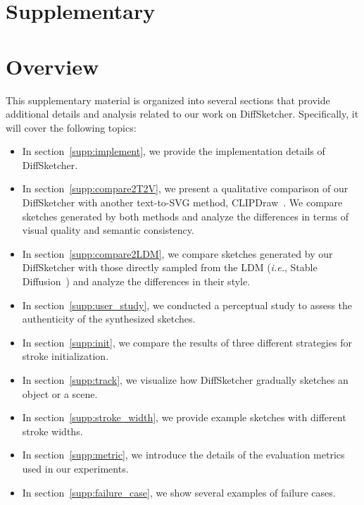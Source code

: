\documentclass{article}
\begin{document}
\medskip

\newpage
\clearpage





\newpage
\clearpage

\appendix

\section*{Supplementary}
\section*{Overview}
This supplementary material is organized into several sections that provide additional details and analysis related to our work on DiffSketcher. Specifically, it will cover the following topics:
\begin{itemize}
\item In section~\ref{supp:implement}, we provide the implementation details of DiffSketcher.
\item In section~\ref{supp:compare2T2V}, we present a qualitative comparison of our DiffSketcher with another text-to-SVG method, CLIPDraw~\cite{clipdraw_frans_2022}. We compare sketches generated by both methods and analyze the differences in terms of visual quality and semantic consistency.
\item In section~\ref{supp:compare2LDM}, we compare sketches generated by our DiffSketcher with those directly sampled from the LDM (\textit{i.e.}, Stable Diffusion~\cite{ldm_2022_Rombach}) and analyze the differences in their style.
\item In section~\ref{supp:user_study}, we conducted a perceptual study to assess the authenticity of the synthesized sketches.
\item In section~\ref{supp:init}, we compare the results of three different strategies for stroke initialization.
\item In section~\ref{supp:track}, we visualize how DiffSketcher gradually sketches an object or a scene. 
\item In section~\ref{supp:stroke_width}, we provide example sketches with different stroke widths.
\item In section~\ref{supp:metric}, we introduce the details of the evaluation metrics used in our experiments.
\item In section~\ref{supp:failure_case}, we show several examples of failure cases.
\end{itemize}
\end{document}
